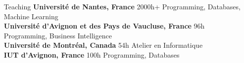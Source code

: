\documentclass[11pt,a4paper]{article}
\begin{document}
\begin{itemize}
\begin{itemize}[
font=\normalfont\bfseries,
itemsep=.1cm,
wide=0cm,
labelsep*=.1cm]
\end{itemize}


\item[Teaching]
\textbf{Université de Nantes, France} \hfill 2000h+ \newline
Programming, Databases, Machine Learning \\[-.5cm]
                    
\textbf{Université d'Avignon et des Pays de Vaucluse, France} \hfill 96h \newline
Programming, Business Intelligence \\[-.5cm]
                    
\textbf{Université de Montréal, Canada} \hfill 54h \newline
Atelier en Informatique \\[-.5cm]
                
\textbf{IUT d'Avignon, France} \hfill 100h \newline
Programming, Databases \\[-.5cm]

\end{itemize}
\end{document}
